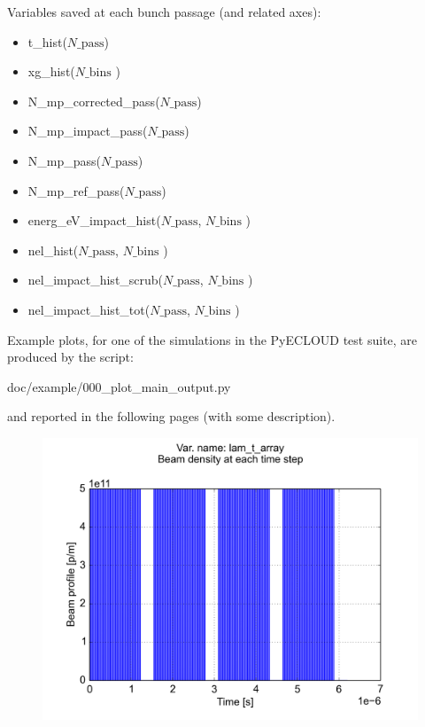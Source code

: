 \documentclass[a4paper,12pt]{article}
\begin{document}
Variables saved at each bunch passage (and related axes):
\begin{itemize}
\item t\_hist($N\_{\mathrm{pass}}$)
\item xg\_hist($N\_{\mathrm{bins}}$ )
\item N\_mp\_corrected\_pass($N\_{\mathrm{pass}}$)
\item N\_mp\_impact\_pass($N\_{\mathrm{pass}}$)
\item N\_mp\_pass($N\_{\mathrm{pass}}$)
\item N\_mp\_ref\_pass($N\_{\mathrm{pass}}$)
\item energ\_eV\_impact\_hist($N\_{\mathrm{pass}}$, $N\_{\mathrm{bins}}$ )
\item nel\_hist($N\_{\mathrm{pass}}$, $N\_{\mathrm{bins}}$ )
\item nel\_impact\_hist\_scrub($N\_{\mathrm{pass}}$, $N\_{\mathrm{bins}}$ )
\item nel\_impact\_hist\_tot($N\_{\mathrm{pass}}$, $N\_{\mathrm{bins}}$ )
\end{itemize}

Example plots, for one of the simulations in the PyECLOUD test suite, are produced by the script:

\hspace{1cm} doc/example/000\_plot\_main\_output.py

and reported  in the following pages (with some description).


\begin{figure}[p]
\begin{center}
\includegraphics[trim = 0 0 0 0, clip, width=.95\textwidth]{../../example/fig01.png}
\end{center}
\end{figure}
\end{document}
